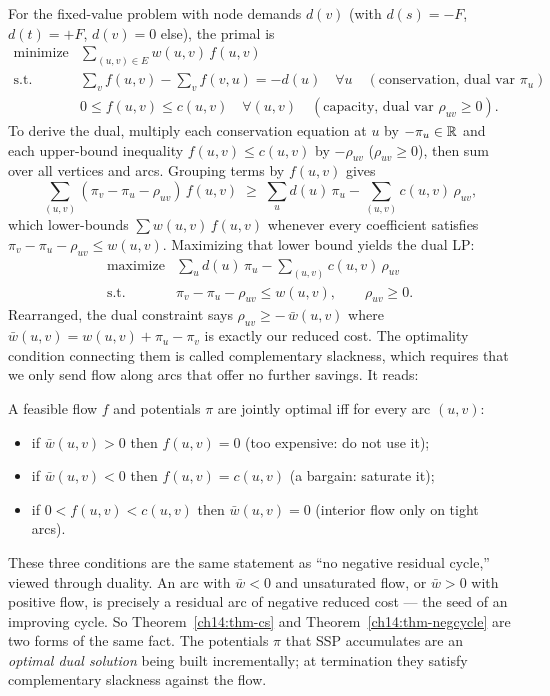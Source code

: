 For the fixed-value problem with node demands $d(v)$ (with $d(s)=-F$, $d(t)=+F$, $d(v)=0$ else), the primal is
\[
\begin{array}{ll}
\text{minimize} & \displaystyle\sum_{(u,v)\in E} w(u,v)\,f(u,v) \\[4pt]
\text{s.t.} & \displaystyle\sum_{v} f(u,v) - \sum_{v} f(v,u) = -d(u) \quad \forall u \quad (\text{conservation, dual var } \pi_u) \\[6pt]
& 0 \le f(u,v) \le c(u,v) \quad \forall (u,v) \quad (\text{capacity, dual var } \rho_{uv}\ge 0).
\end{array}
\]
To derive the dual, multiply each conservation equation at $u$ by $-\pi_u\in\mathbb{R}$ and each upper-bound inequality $f(u,v)\le c(u,v)$ by $-\rho_{uv}$ ($\rho_{uv}\ge 0$), then sum over all vertices and arcs. Grouping terms by $f(u,v)$ gives
\[
  \sum_{(u,v)} (\pi_v - \pi_u - \rho_{uv})\,f(u,v) \;\ge\; \sum_u d(u)\,\pi_u - \sum_{(u,v)} c(u,v)\,\rho_{uv},
\]
which lower-bounds $\sum w(u,v)\,f(u,v)$ whenever every coefficient satisfies $\pi_v - \pi_u - \rho_{uv} \le w(u,v)$. Maximizing that lower bound yields the dual LP:
\[
\begin{array}{ll}
\text{maximize} & \displaystyle\sum_u d(u)\,\pi_u - \sum_{(u,v)} c(u,v)\,\rho_{uv} \\[4pt]
\text{s.t.} & \pi_v - \pi_u - \rho_{uv} \le w(u,v),\qquad \rho_{uv}\ge 0 .
\end{array}
\]
Rearranged, the dual constraint says $\rho_{uv} \ge -\,\bar w(u,v)$ where $\bar w(u,v)=w(u,v)+\pi_u-\pi_v$ is exactly our reduced cost. The optimality condition connecting them is called complementary slackness, which requires that we only send flow along arcs that offer no further savings. It reads:

\begin{theorem}\label{ch14:thm-cs}
A feasible flow $f$ and potentials $\pi$ are jointly optimal iff for every arc $(u,v)$:
\begin{itemize}
  \item if $\bar w(u,v) > 0$ then $f(u,v)=0$ (too expensive: do not use it);
  \item if $\bar w(u,v) < 0$ then $f(u,v)=c(u,v)$ (a bargain: saturate it);
  \item if $0 < f(u,v) < c(u,v)$ then $\bar w(u,v)=0$ (interior flow only on tight arcs).
\end{itemize}
\end{theorem}

\begin{whybox}
These three conditions are the same statement as ``no negative residual cycle,'' viewed through duality. An arc with $\bar w<0$ and unsaturated flow, or $\bar w>0$ with positive flow, is precisely a residual arc of negative reduced cost --- the seed of an improving cycle. So Theorem~\ref{ch14:thm-cs} and Theorem~\ref{ch14:thm-negcycle} are two forms of the same fact. The potentials $\pi$ that SSP accumulates are an \emph{optimal dual solution} being built incrementally; at termination they satisfy complementary slackness against the flow.
\end{whybox}


